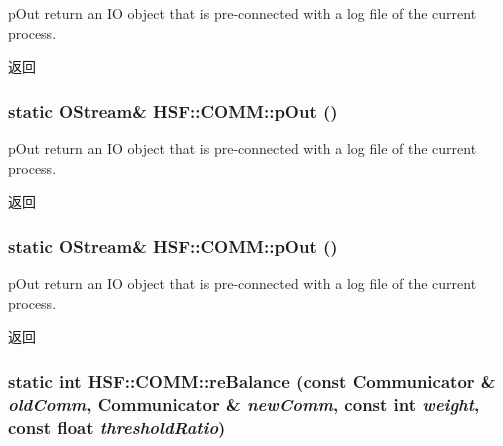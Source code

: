 pOut return an IO object that is pre-\/connected with a log file of the current process. \begin{DoxyReturn}{返回}

\end{DoxyReturn}
\hypertarget{classHSF_1_1COMM_a34972039314a2f48f084316f6c2a02bb}{
\subsubsection[{pOut}]{\setlength{\rightskip}{0pt plus 5cm}static {\bf OStream}\& HSF::COMM::pOut ()}}
\label{classHSF_1_1COMM_a34972039314a2f48f084316f6c2a02bb}


pOut return an IO object that is pre-\/connected with a log file of the current process. \begin{DoxyReturn}{返回}

\end{DoxyReturn}
\hypertarget{classHSF_1_1COMM_a34972039314a2f48f084316f6c2a02bb}{
\subsubsection[{pOut}]{\setlength{\rightskip}{0pt plus 5cm}static {\bf OStream}\& HSF::COMM::pOut ()}}
\label{classHSF_1_1COMM_a34972039314a2f48f084316f6c2a02bb}


pOut return an IO object that is pre-\/connected with a log file of the current process. \begin{DoxyReturn}{返回}

\end{DoxyReturn}
\hypertarget{classHSF_1_1COMM_aaaf021a10daa5fbfa85102953a0d8f1c}{
\subsubsection[{reBalance}]{\setlength{\rightskip}{0pt plus 5cm}static int HSF::COMM::reBalance (const {\bf Communicator} \& {\em oldComm}, \/  {\bf Communicator} \& {\em newComm}, \/  const int {\em weight}, \/  const float {\em thresholdRatio})}}
\label{classHSF_1_1COMM_aaaf021a10daa5fbfa85102953a0d8f1c}


